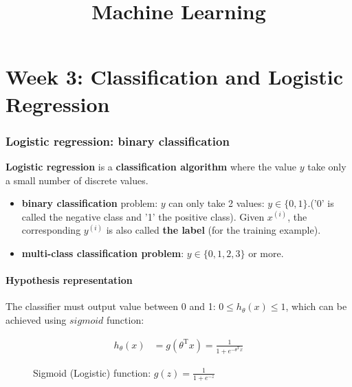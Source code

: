 \documentclass[a4paper,12pt]{report}
\begin{document}
\tableofcontents

\title{Machine Learning}
\maketitle
\part{Week 3: Classification and Logistic Regression}
\section{Logistic regression: binary classification}
\textbf{Logistic regression} is a \textbf{classification algorithm} where the value $y$ take only a small number of discrete values. 
\\
\begin{itemize}
\item \textbf{binary classification} problem: $y$ can only take 2 values: $y \in \{0,1\}$.('0' is called the negative class and '1' the positive class). Given $x^{(i)}$, the corresponding $y^{(i)}$ is also called \textbf{the label} (for the training example).
\item \textbf{multi-class classification problem}: $y \in \{0,1,2,3\}$ or more.
\end{itemize}

\subsection{Hypothesis representation}
The classifier must output value between 0 and 1: $ 0 \leq h_{\theta}(x)  \leq 1$, which can be achieved using $sigmoid$ function:

\begin{align*}
h_{\theta}(x) & = g(\theta^{\mathrm{T}} x) = \frac{1}{1+e^{- \theta^{\mathrm{T}}x}}
\end{align*}

\begin{figure}
\centering
{}
\caption{Sigmoid (Logistic) function: $g(z) =\frac{1}{1+e^{-z}} $} \label{fig:M1}
\end{figure}
\end{document}
